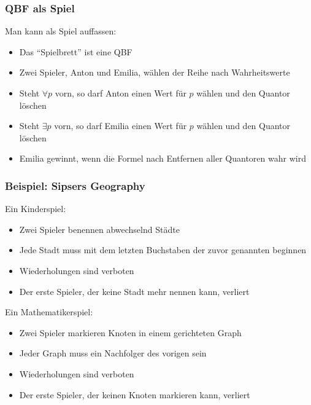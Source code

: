\documentclass[onlymath]{beamer}
\begin{document}
\begin{frame}\frametitle{QBF als Spiel}

Man kann  als Spiel auffassen:
\begin{itemize}
\item Das "`Spielbrett"' ist eine QBF
\item Zwei Spieler, \alert{Anton} und \alert{Emilia}, wählen der Reihe nach Wahrheitswerte
\item Steht $\forall p$ vorn, so darf Anton einen Wert für $p$ wählen und den Quantor löschen
\item Steht $\exists p$ vorn, so darf Emilia einen Wert für $p$ wählen und den Quantor löschen
\item Emilia gewinnt, wenn die Formel nach Entfernen aller Quantoren wahr wird
\end{itemize}\bigskip\pause


\end{frame}

\begin{frame}\frametitle{Beispiel: Sipsers Geography}

\alert{Ein Kinderspiel:}
\begin{itemize}
\item Zwei Spieler benennen abwechselnd Städte
\item Jede Stadt muss mit dem letzten Buchstaben der zuvor genannten beginnen
\item Wiederholungen sind verboten
\item Der erste Spieler, der keine Stadt mehr nennen kann, verliert
\end{itemize}
\smallskip

\pause
\alert{Ein Mathematikerspiel:}
\begin{itemize}
\item Zwei Spieler markieren Knoten in einem gerichteten Graph
\item Jeder Graph muss ein Nachfolger des vorigen sein
\item Wiederholungen sind verboten
\item Der erste Spieler, der keinen Knoten markieren kann, verliert
\end{itemize}
\smallskip\pause

{}

\end{frame}
\end{document}
